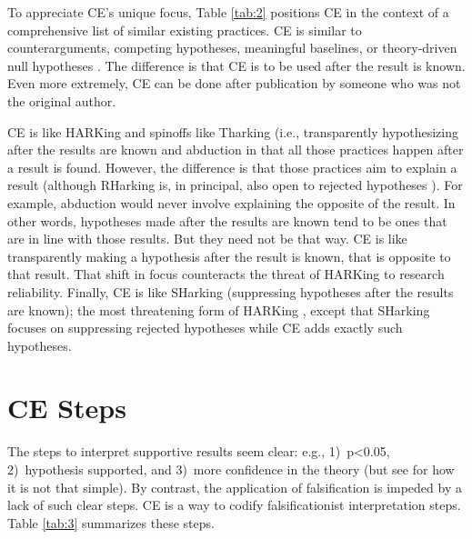 \documentclass[authordate, meta]{jote-new-article}
\begin{document}
To appreciate CE's unique focus, Table \ref{tab:2} positions CE in the context of a comprehensive list of similar existing practices. CE is similar to counterarguments, competing hypotheses, meaningful baselines, or theory-driven null hypotheses \parencite[e.g.,][]{Schwab2012}. The difference is that CE is to be used after the result is known. Even more extremely, CE can be done after publication by someone who was not the original author.


CE is like HARKing and spinoffs like Tharking (i.e., transparently hypothesizing after the results are known \parencite{Hollenbeck2017, Rubin2017} and abduction \parencite{Locke2008, Schwab2017} in that all those practices happen after a result is found. However, the difference is that those practices aim to explain a result (although RHarking is, in principal, also open to rejected hypotheses \parencite{Rubin2017}). For example, abduction would never involve explaining the opposite of the result. In other words, hypotheses made after the results are known tend to be ones that are in line with those results. But they need not be that way. CE is like transparently making a hypothesis after the result is known, that is opposite to that result. That shift in focus counteracts the threat of HARKing to research reliability. Finally, CE is like SHarking (suppressing hypotheses after the results are known); the most threatening form of HARKing \parencite{Rubin2017}, except that SHarking focuses on suppressing rejected hypotheses while CE adds exactly such hypotheses.

\section{CE Steps}

The steps to interpret supportive results seem clear: e.g., 1)\ p<0.05, 2)\ hypothesis supported, and 3)\ more confidence in the theory (but see \textcite{Wasserstein2019} for how it is not that simple). By contrast, the application of falsification is impeded by a lack of such clear steps. CE is a way to codify falsificationist interpretation steps. Table \ref{tab:3} summarizes these steps.
\end{document}
